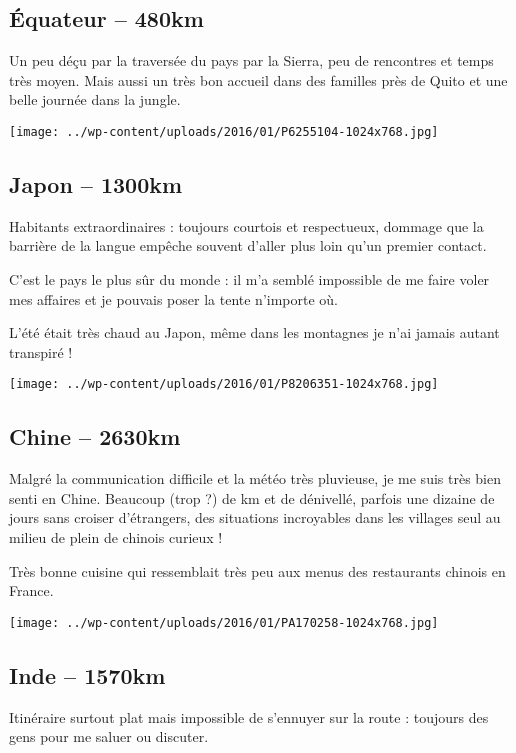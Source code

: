  \subsection*{\'Equateur – 480km}
 Un peu déçu par la traversée du pays par la Sierra, peu de rencontres et temps très moyen. Mais aussi un très bon accueil dans des familles près de Quito et une belle journée dans la jungle. 
\begin{center} \texttt{[image: ../wp-content/uploads/2016/01/P6255104-1024x768.jpg]} \end{center}
\vspace{-\topsep}
\pagebreak
 
 \subsection*{Japon – 1300km}
 Habitants extraordinaires : toujours courtois et respectueux, dommage que la barrière de la langue empêche souvent d'aller plus loin qu'un premier contact. 

 C'est le pays le plus sûr du monde : il m'a semblé impossible de me faire voler mes affaires et je pouvais poser la tente n'importe où. 

 L'été était très chaud au Japon, même dans les montagnes je n'ai jamais autant transpiré ! 
\begin{center} \texttt{[image: ../wp-content/uploads/2016/01/P8206351-1024x768.jpg]} \end{center}
\vspace{-\topsep}
\pagebreak
 
 \subsection*{Chine – 2630km}
 Malgré la communication difficile et la météo très pluvieuse, je me suis très bien senti en Chine. Beaucoup (trop ?) de km et de dénivellé, parfois une dizaine de jours sans croiser d'étrangers, des situations incroyables dans les villages seul au milieu de plein de chinois curieux ! 

 Très bonne cuisine qui ressemblait très peu aux menus des restaurants chinois en France.
\begin{center} \texttt{[image: ../wp-content/uploads/2016/01/PA170258-1024x768.jpg]} \end{center}
\vspace{-\topsep}
\pagebreak
 
 \subsection*{Inde – 1570km}
 Itinéraire surtout plat mais impossible de s'ennuyer sur la route : toujours des gens pour me saluer ou discuter.

